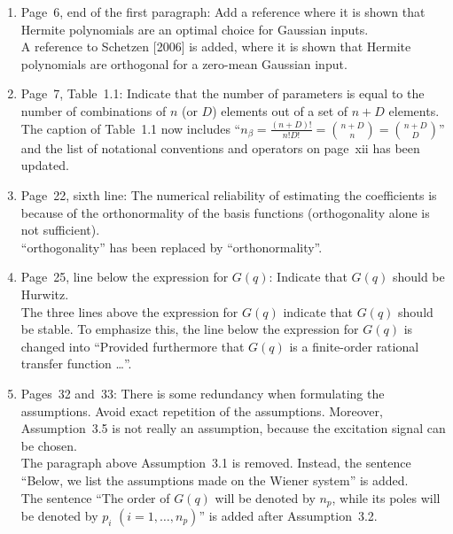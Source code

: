 \documentclass{article}
\newenvironment{answer}{\noindent\ignorespaces\color{blue}}{\noindent\ignorespacesafterend}
\newcommand{\ans}[1]{\begin{answer}#1\end{answer}}
\newcommand{\oldnewpage}[2]{\marginpar{{\color{black}#1} / {\color{red}#2}}}
\begin{document}
\begin{enumerate}
	\item Page~6, end of the first paragraph: Add a reference where it is shown that Hermite polynomials are an optimal choice for Gaussian inputs. \\
		\ans{\oldnewpage{6}{6}A reference to Schetzen [2006] is added, where it is shown that Hermite polynomials are orthogonal for a zero-mean Gaussian input.}
	\item Page~7, Table~1.1: Indicate that the number of parameters is equal to the number of combinations of $n$ (or $D$) elements out of a set of \mbox{$n+D$} elements.\\
		\ans{{\vspace*{-1.2em}\oldnewpage{7 and~xii}{8 and~xii}\vspace*{1.2em}}The caption of Table~1.1 now includes ``\mbox{$n_\beta = \frac{(n+D)!}{n! D!} = \binom{n+D}{n} = \binom{n+D}{D}$}'' and the list of notational conventions and operators on page~xii has been updated.}
	\item Page~22, sixth line: The numerical reliability of estimating the coefficients is because of the orthonormality of the basis functions (orthogonality alone is not sufficient).\\
		\ans{{\vspace*{-1.2em}\oldnewpage{22}{24}\vspace*{1.2em}}``orthogonality'' has been replaced by ``orthonormality''.}
	\item Page~25, line below the expression for $G(q)$: Indicate that $G(q)$ should be Hurwitz.\\
		\ans{\oldnewpage{25}{27--28}The three lines above the expression for $G(q)$ indicate that $G(q)$ should be stable. To emphasize this, the line below the expression for $G(q)$ is changed into ``Provided furthermore that $G(q)$ is a finite-order rational transfer function \ldots''.}
	\item \label{item: redundancy assumptions}
		Pages~32 and~33: There is some redundancy when formulating the assumptions. Avoid exact repetition of the assumptions. Moreover, Assumption~3.5 is not really an assumption, because the excitation signal can be chosen.\\
		\ans{\oldnewpage{32--33}{36--37}The paragraph above Assumption~3.1 is removed. Instead, the sentence ``Below, we list the assumptions made on the Wiener system'' is added.\\
			The sentence ``The order of $G(q)$ will be denoted by $n_p$, while its poles will be denoted by $p_i$ \mbox{$(i = 1, \ldots, n_p)$}'' is added after Assumption~3.2.\\
}
\end{enumerate}
\end{document}
